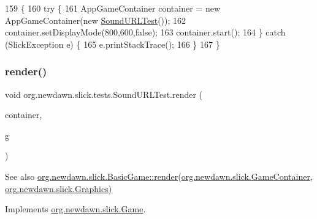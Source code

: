 \begin{DoxyCode}
159                                            \{
160         \textcolor{keywordflow}{try} \{
161             AppGameContainer container = \textcolor{keyword}{new} AppGameContainer(\textcolor{keyword}{new} \mbox{\hyperlink{classorg_1_1newdawn_1_1slick_1_1tests_1_1_sound_u_r_l_test_ae74c5053ad1b41a8f07d57a50c70beea}{SoundURLTest}}());
162             container.setDisplayMode(800,600,\textcolor{keyword}{false});
163             container.start();
164         \} \textcolor{keywordflow}{catch} (SlickException e) \{
165             e.printStackTrace();
166         \}
167     \}
\end{DoxyCode}
\mbox{\label{classorg_1_1newdawn_1_1slick_1_1tests_1_1_sound_u_r_l_test_aa18c580ddd0f25c984afaaad050b7200}} 
\subsubsection{\texorpdfstring{render()}{render()}}
{\footnotesize\ttfamily void org.\+newdawn.\+slick.\+tests.\+Sound\+U\+R\+L\+Test.\+render (\begin{DoxyParamCaption}\item[{\mbox{\hyperlink{classorg_1_1newdawn_1_1slick_1_1_game_container}{Game\+Container}}}]{container,  }\item[{\mbox{\hyperlink{classorg_1_1newdawn_1_1slick_1_1_graphics}{Graphics}}}]{g }\end{DoxyParamCaption})\hspace{0.3cm}{\ttfamily [inline]}}

\begin{DoxySeeAlso}{See also}
\mbox{\hyperlink{interfaceorg_1_1newdawn_1_1slick_1_1_game_af1a4670d43eb3ba04dfcf55ab1975b64}{org.\+newdawn.\+slick.\+Basic\+Game\+::render}}(\mbox{\hyperlink{classorg_1_1newdawn_1_1slick_1_1_game_container}{org.\+newdawn.\+slick.\+Game\+Container}}, \mbox{\hyperlink{classorg_1_1newdawn_1_1slick_1_1_graphics}{org.\+newdawn.\+slick.\+Graphics}}) 
\end{DoxySeeAlso}


Implements \mbox{\hyperlink{interfaceorg_1_1newdawn_1_1slick_1_1_game_af1a4670d43eb3ba04dfcf55ab1975b64}{org.\+newdawn.\+slick.\+Game}}.


